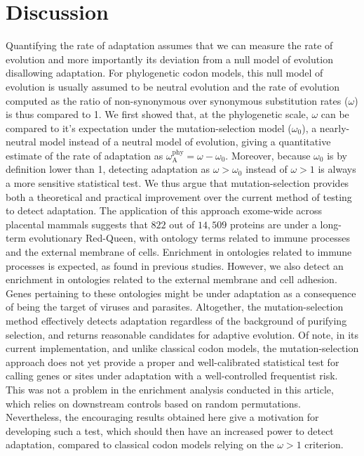 \documentclass{article}
\newcommand{\rateApop}{\omega_{\mathrm{A}}}
\newcommand{\rateAphy}{\rateApop^{\mathrm{phy}}}
\begin{document}
    \section*{Discussion}\label{sec:discussion}

    Quantifying the rate of adaptation assumes that we can measure the rate of evolution and more importantly its deviation from a null model of evolution disallowing adaptation.
    For phylogenetic codon models, this null model of evolution is usually assumed to be neutral evolution and the rate of evolution computed as the ratio of non-synonymous over synonymous substitution rates ($\omega$) is thus compared to 1.
    We first showed that, at the phylogenetic scale, $\omega$ can be compared to it's expectation under the mutation-selection model ($\omega_{0}$), a nearly-neutral model instead of a neutral model of evolution, giving a quantitative estimate of the rate of adaptation as $\rateAphy = \omega - \omega_{0}$.
    Moreover, because $\omega_{0}$ is by definition lower than 1\cite{spielman_relationship_2015}, detecting adaptation as $\omega > \omega_{0}$ instead of $\omega > 1$ is always a more sensitive statistical test.
    We thus argue that mutation-selection provides both a theoretical and practical improvement over the current method of testing to detect adaptation.
    The application of this approach exome-wide across placental mammals suggests that $822$ out of $14,509$ proteins are under a long-term evolutionary Red-Queen, with ontology terms related to immune processes and the external membrane of cells.
    Enrichment in ontologies related to immune processes is expected, as found in previous studies\cite{kosiol_patterns_2008}.
    However, we also detect an enrichment in ontologies related to the external membrane and cell adhesion.
    Genes pertaining to these ontologies might be under adaptation as a consequence of being the target of viruses and parasites\cite{enard_viruses_2016, ebel_high_2017}.
    Altogether, the mutation-selection method effectively detects adaptation regardless of the background of purifying selection, and returns reasonable candidates for adaptive evolution.
    Of note, in its current implementation, and unlike classical codon models\cite{wong_accuracy_2004, yang_paml_2007}, the mutation-selection approach does not yet provide a proper and well-calibrated statistical test for calling genes or sites under adaptation with a well-controlled frequentist risk.
    This was not a problem in the enrichment analysis conducted in this article, which relies on downstream controls based on random permutations.
    Nevertheless, the encouraging results obtained here give a motivation for developing such a test, which should then have an increased power to detect adaptation, compared to classical codon models relying on the $\omega > 1$ criterion.
\end{document}
